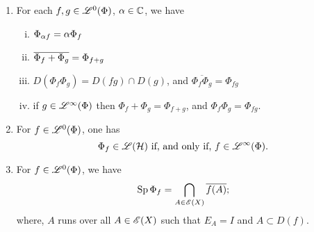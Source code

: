 \begin{thrm}
\begin{enumerate}
\item 
For each $f, g \in \mathscr{L}^0(\Phi)$, $\alpha \in \mathbb{C}$, we have

\begin{enumerate}[(i)]
  \item $\Phi_{\alpha f} = \alpha \Phi_f$
  \item $ \overline{\Phi_f + \Phi_g} = \Phi_{f + g}$
  \item $D(\Phi_f \Phi_g) = D(fg) \cap D(g)$, and $\overline{\Phi_f \Phi_g}
  = \Phi_{fg}$
  \item if $g \in \mathscr{L}^\infty (\Phi)$ then $\Phi_f + \Phi_g = \Phi_{f+g}$, and 
  $\Phi_f \Phi_g = \Phi_{fg}$.
\end{enumerate}

\item
For $f \in \mathscr{L}^0(\Phi)$, one has
\[
\Phi_f \in \mathscr{L}(\mathcal{H}) \text{ if, and only if, } f \in \mathscr{L}^\infty (\Phi).
\]

\item
For $f \in \mathscr{L}^0(\Phi)$, we have
\[
\operatorname{Sp} \Phi_f = \bigcap_{A \in \mathscr{E}(X)} \overline{f(A)};
\]
where, $A$ runs over all $A \in \mathscr{E}(X)$ such that $E_A = I$ and 
$A \subset D(f)$. 


\end{enumerate}

\end{thrm}












